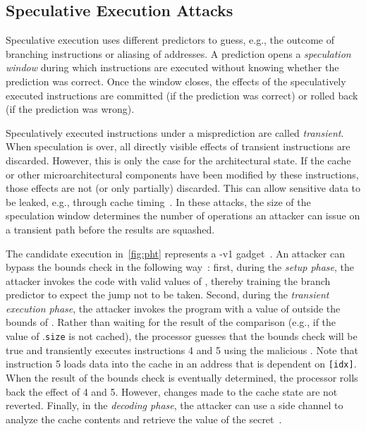 \documentclass[conference]{IEEEtran}
\begin{document}
\subsection{Speculative Execution Attacks}
\label{sec:se}

Speculative execution uses different predictors to guess, e.g., the outcome of branching instructions or aliasing of addresses.
A prediction opens a \emph{speculation window} during which instructions are executed without knowing whether the prediction was correct. 
Once the window closes, the effects of the speculatively executed instructions are committed (if the prediction was correct) or rolled back (if the prediction was wrong).

Speculatively executed instructions under a misprediction are called \emph{transient}.
When speculation is over, all directly visible effects of transient instructions are discarded.
However, this is only the case for the architectural state.
If the cache or other microarchitectural components have been modified by these instructions, those effects are not (or only partially) discarded.
This can allow sensitive data to be leaked, e.g., through cache timing~\cite{KocherHFGGHHLM019,LiuYGHL15}.
In these attacks, the size of the speculation window determines the number of operations an attacker can issue on a transient path before the results are squashed.

The candidate execution in~\autoref{fig:pht} represents a \spectre-v1 gadget~\cite{KocherHFGGHHLM019}.
An attacker can bypass the bounds check in the following way~\cite{CanellaB0LBOPEG19}:
first, during the \emph{setup phase}, the attacker invokes the code with valid values of \varidx, thereby training the branch predictor to expect the jump not to be taken.
Second, during the \emph{transient execution phase}, the attacker invokes the program with a value of \varidx outside the bounds of \varA.
Rather than waiting for the result of the comparison (e.g., if the value of \varA.\texttt{size} is not cached), the processor guesses that the bounds check will be true and transiently executes instructions 4 and 5 using the malicious \varidx.
Note that instruction 5 loads data into the cache in an address that is dependent on \texttt{{\varA}[{\color{violet}idx}]}.
When the result of the bounds check is eventually determined, the processor rolls back the effect of 4 and 5. %
However, changes made to the cache state are not reverted.
Finally, in the \emph{decoding phase}, the attacker can use a side channel to analyze the cache contents and retrieve the value of the secret~\cite{LiuYGHL15}.
\end{document}
